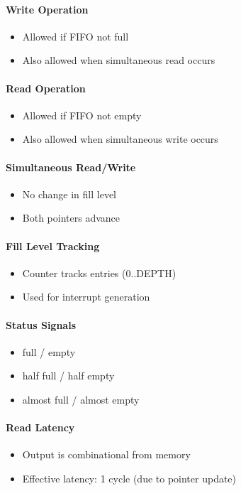 \paragraph{Write Operation}
\begin{itemize}
  \item Allowed if FIFO not full
  \item Also allowed when simultaneous read occurs
\end{itemize}

\paragraph{Read Operation}
\begin{itemize}
  \item Allowed if FIFO not empty
  \item Also allowed when simultaneous write occurs
\end{itemize}

\paragraph{Simultaneous Read/Write}
\begin{itemize}
  \item No change in fill level
  \item Both pointers advance
\end{itemize}

\paragraph{Fill Level Tracking}
\begin{itemize}
  \item Counter tracks entries (0..DEPTH)
  \item Used for interrupt generation
\end{itemize}

\paragraph{Status Signals}
\begin{itemize}
  \item full / empty
  \item half full / half empty
  \item almost full / almost empty
\end{itemize}

\paragraph{Read Latency}
\begin{itemize}
  \item Output is combinational from memory
  \item Effective latency: 1 cycle (due to pointer update)
\end{itemize}

